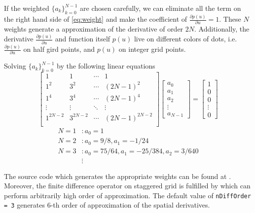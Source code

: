 \documentclass[11pt]{article}
\theoremstyle{plain}
\theoremstyle{definition}
\theoremstyle{remark}
\numberwithin{equation}{section}
\begin{document}
If the weighted $\{ a_k\}_{k=0}^{N-1}$ are chosen carefully, we can eliminate all the term on the right hand side of \eqref{eq:weight} and make the coefficient of $\frac{\partial p(u)}{\partial u} =1$. These $N$ weights generate a approximation of the derivative of order $2N$. Additionally, the derivative $\frac{\partial p(u)}{\partial u}$ and function itself $p(u)$ live on different colors of dots, i.e. $\frac{\partial p(u)}{\partial u}$ on half gird points, and $p(u)$ on integer grid points.

Solving $\{a_k\}_{k=0}^{N-1}$ by the following linear equations
\begin{equation*}
\begin{bmatrix}
  1 & 1 & \cdots & 1 \\
  1^2 & 3^2 & \cdots & (2N-1)^2 \\
  1^4 & 3^4 & \cdots & (2N-1)^4 \\
  \vdots & \vdots & \ddots & \vdots \\
  1^{2N-2} & 3^{2N-2} & \cdots & (2N-1)^{2N-2} \\
\end{bmatrix}
\begin{bmatrix}
  a_0 \\ a_1 \\ a_2 \\ \vdots \\ a_{N-1}
\end{bmatrix}
=
\begin{bmatrix}
  1 \\ 0 \\ 0 \\ \vdots \\ 0
\end{bmatrix}
\end{equation*}
\begin{equation*}
  \begin{aligned}
  N = 1&: a_0 = 1\\
  N = 2&: a_0 = 9/8, a_1 = -1/24\\
  N = 3&: a_0 = 75/64, a_1 = -25/384, a_2 = 3/640\\
  &\vdots
  \end{aligned}
\end{equation*}

The source code which generates the appropriate weights can be found at . Moreover, the finite difference operator on staggered grid is fulfilled by  which can perform arbitrarily high order of approximation. The default value of \texttt{nDiffOrder = 3} generates 6-th order of approximation of the spatial derivatives.
\end{document}
